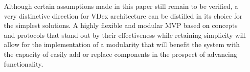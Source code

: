 \documentclass[]{article}
\begin{document}
Although certain assumptions made in this paper still remain to be verified,
a very distinctive direction for VDex architecture can be distilled in its choice for the simplest solutions. A highly flexible and modular MVP
based on concepts and protocols that stand out by their effectiveness
while retaining simplicity will allow for the implementation of a modularity that will benefit the system with the capacity of easily add or replace components
in the prospect of advancing functionality.



\cite{1}
\cite{2}
\cite{3}
\cite{4}
\cite{5}
\cite{6}
\cite{7}
\cite{8}
\cite{9}
\cite{10}
\cite{11}
\cite{12}
\cite{13}
\cite{14}
\cite{15}
\cite{16}
\cite{17}
\cite{18}
\cite{19}
\end{document}
